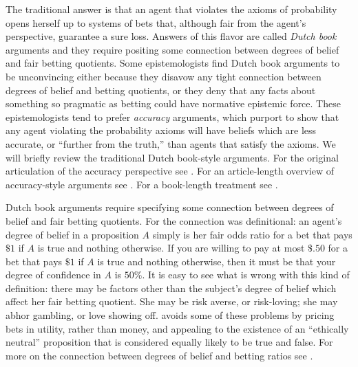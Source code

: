 The traditional answer is that an agent that violates the axioms of probability
opens herself up to systems of bets that, although fair from the agent's
perspective, guarantee a sure loss. Answers of this flavor are called {\em Dutch
book} arguments and they require positing some connection between degrees of
belief and fair betting quotients. Some epistemologists find Dutch book
arguments to be unconvincing either because they disavow any tight connection
between degrees of belief and betting quotients, or they deny that any facts
about something so pragmatic as betting could have normative epistemic force.
These epistemologists tend to prefer {\em accuracy} arguments, which purport to
show that any agent violating the probability axioms will have beliefs which are
less accurate, or ``further from the truth,'' than agents that satisfy the
axioms. We will briefly review the traditional Dutch book-style arguments. For
the original articulation of the accuracy perspective see
\citet{joyce1998nonpragmatic}. For an article-length overview of accuracy-style
arguments see \citet{sep-epistemic-utility}. For a book-length treatment see
\citet{pettigrew2016accuracy}.  

Dutch book arguments require specifying some connection between degrees of
belief and fair betting quotients. For \citet{de1937prevision} the connection
was definitional: an agent's degree of belief in a proposition $A$ simply is her
fair odds ratio for a bet that pays $\$1$ if $A$ is true and nothing otherwise.
If you are willing to pay at most $\$.50$ for a bet that pays $\$1$ if $A$ is
true and nothing otherwise, then it must be that your degree of confidence in
$A$ is $50\%$. It is easy to see what is wrong with this kind of definition:
there may be factors other than the subject's degree of belief which affect her
fair betting quotient. She may be risk averse, or risk-loving; she may abhor
gambling, or love showing off. \citet{ramseytruth} avoids some of these problems
by pricing bets in utility, rather than money, and appealing to the existence of
an ``ethically neutral'' proposition that is considered equally likely to be
true and false. For more on the connection between degrees of belief and betting
ratios see \citet{eriksson2007degrees}.

